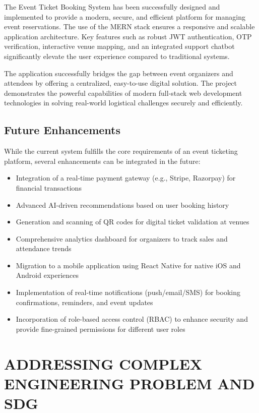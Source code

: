 \documentclass[12pt]{report}
\begin{document}
The Event Ticket Booking System has been successfully designed and implemented to provide a modern, secure, and efficient platform for managing event reservations. The use of the MERN stack ensures a responsive and scalable application architecture. Key features such as robust JWT authentication, OTP verification, interactive venue mapping, and an integrated support chatbot significantly elevate the user experience compared to traditional systems.

The application successfully bridges the gap between event organizers and attendees by offering a centralized, easy-to-use digital solution. The project demonstrates the powerful capabilities of modern full-stack web development technologies in solving real-world logistical challenges securely and efficiently.

\section{Future Enhancements} 

While the current system fulfills the core requirements of an event ticketing platform, several enhancements can be integrated in the future:

\begin{itemize}
\item Integration of a real-time payment gateway (e.g., Stripe, Razorpay) for financial transactions
\item Advanced AI-driven recommendations based on user booking history
\item Generation and scanning of QR codes for digital ticket validation at venues
\item Comprehensive analytics dashboard for organizers to track sales and attendance trends
\item Migration to a mobile application using React Native for native iOS and Android experiences
\item Implementation of real-time notifications (push/email/SMS) for booking confirmations, reminders, and event updates
\item Incorporation of role-based access control (RBAC) to enhance security and provide fine-grained permissions for different user roles
\end{itemize}


\chapter{ADDRESSING COMPLEX ENGINEERING PROBLEM AND SDG}
\end{document}
